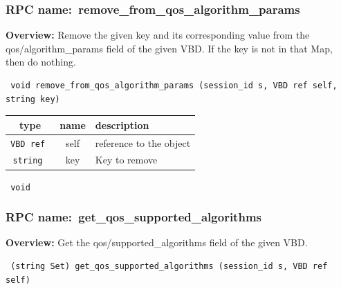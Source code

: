 \vspace{0.3cm}
\vspace{0.3cm}
\vspace{0.3cm}
\subsubsection{RPC name:~remove\_from\_qos\_algorithm\_params}

{\bf Overview:} 
Remove the given key and its corresponding value from the
qos/algorithm\_params field of the given VBD.  If the key is not in that
Map, then do nothing.

\begin{verbatim} void remove_from_qos_algorithm_params (session_id s, VBD ref self, string key)\end{verbatim}



 
\vspace{0.3cm}
\begin{tabular}{|c|c|p{7cm}|}
 \hline
{\bf type} & {\bf name} & {\bf description} \\ \hline
{\tt VBD ref } & self & reference to the object \\ \hline 

{\tt string } & key & Key to remove \\ \hline 

\end{tabular}

\vspace{0.3cm}

{\tt 
void
}



\vspace{0.3cm}
\vspace{0.3cm}
\vspace{0.3cm}
\subsubsection{RPC name:~get\_qos\_supported\_algorithms}

{\bf Overview:} 
Get the qos/supported\_algorithms field of the given VBD.

\begin{verbatim} (string Set) get_qos_supported_algorithms (session_id s, VBD ref self)\end{verbatim}



